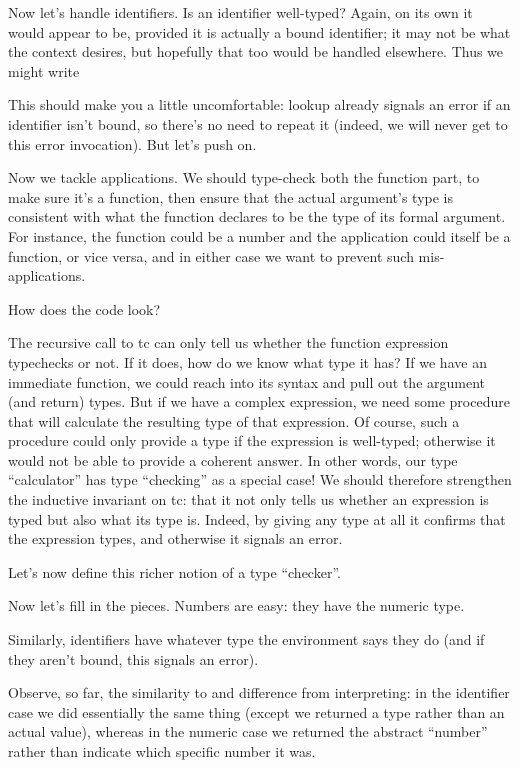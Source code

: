 Now let’s handle identifiers. Is an identifier well-typed? Again, on its own it
would appear to be, provided it is actually a bound identifier; it may not be
what the context desires, but hopefully that too would be handled elsewhere.
Thus we might write

This should make you a little uncomfortable: lookup already signals an error if
an identifier isn’t bound, so there’s no need to repeat it (indeed, we will
never get to this error invocation). But let’s push on.

Now we tackle applications. We should type-check both the function part, to make
sure it’s a function, then ensure that the actual argument’s type is consistent
with what the function declares to be the type of its formal argument. For
instance, the function could be a number and the application could itself be a
function, or vice versa, and in either case we want to prevent such
mis-applications.

How does the code look?

The recursive call to tc can only tell us whether the function expression
typechecks or not. If it does, how do we know what type it has? If we have an
immediate function, we could reach into its syntax and pull out the argument
(and return) types. But if we have a complex expression, we need some procedure
that will calculate the resulting type of that expression. Of course, such a
procedure could only provide a type if the expression is well-typed; otherwise
it would not be able to provide a coherent answer. In other words, our type
“calculator” has type “checking” as a special case! We should therefore
strengthen the inductive invariant on tc: that it not only tells us whether an
expression is typed but also what its type is. Indeed, by giving any type at all
it confirms that the expression types, and otherwise it signals an error.

Let’s now define this richer notion of a type “checker”.

Now let’s fill in the pieces. Numbers are easy: they have the numeric type.

Similarly, identifiers have whatever type the environment says they do (and if
they aren’t bound, this signals an error).

Observe, so far, the similarity to and difference from interpreting: in the
identifier case we did essentially the same thing (except we returned a type
rather than an actual value), whereas in the numeric case we returned the
abstract “number” rather than indicate which specific number it was.

